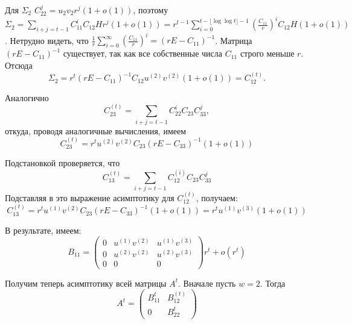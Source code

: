 \documentclass[11pt]{article}
\begin{document}
Для $\Sigma_2$ $C_{22}^j = u_2 v_2 r^j (1 + o(1))$, поэтому $\Sigma_2 = \sum_{i + j = t-1} C_{11}^i C_{12} H r^j (1 + o(1)) = r^{t - 1} \sum_{i = 0}^{t - \lfloor \log \log t \rfloor - 1} \left(\frac{C_{11}}{r}\right)^i C_{12} H (1 + o(1))$. Нетрудно видеть, что $\frac{1}{r} \sum_{i = 0}^{\infty} \left(\frac{C_{11}}{r}\right)^i = (rE - C_{11})^{-1}$. Матрица $(rE - C_{11})^{-1}$ существует, так как все собственные числа $C_{11}$ строго меньше $r$. Отсюда
\begin{equation}
    \Sigma_2 = r^t (rE - C_{11})^{-1} C_{12} u^{(2)} v^{(2)} (1 + o(1)) = C_{12}^{(t)}.
\end{equation}

Аналогично
\begin{equation}
    C_{23}^{(t)} = \sum_{i + j = t-1} C_{22}^i C_{23} C_{33}^j,
\end{equation}
откуда, проводя аналогичные вычисления, имеем
\begin{equation}
    C_{23}^{(t)} = r^t u^{(2)} v^{(2)} C_{23} (rE - C_{33})^{-1} (1 + o(1))
\end{equation}

Подстановкой проверяется, что
\begin{equation}
    C_{13}^{(t)} = \sum_{i + j = t-1} C_{12}^{(i)} C_{23} C_{33}^j
\end{equation}
Подставляя в это выражение асимптотику для $C_{12}^{(t)}$, получаем:
\begin{equation}
    C_{13}^{(t)} = r^t u^{(1)} v^{(2)} C_{23} (rE - C_{33})^{-1} (1 + o(1)) = r^t u^{(1)} v^{(3)} (1 + o(1))
\end{equation}

В результате, имеем:
\begin{equation}
    B_{11} = 
    \begin{pmatrix}
        0 & u^{(1)} v^{(2)} & u^{(1)} v^{(3)} \\
        0 & u^{(2)} v^{(2)} & u^{(2)} v^{(3)} \\
        0 & 0 & 0
    \end{pmatrix}
    r^t + o(r^t)
\end{equation}

Получим теперь асимптотику всей матрицы $A^t$. Вначале пусть $w = 2$. Тогда
\begin{equation}
    A^t = 
    \begin{pmatrix}
        B_{11}^t & B_{12}^{(t)} \\
        0 & B_{22}^t
    \end{pmatrix}
\end{equation}
\end{document}

